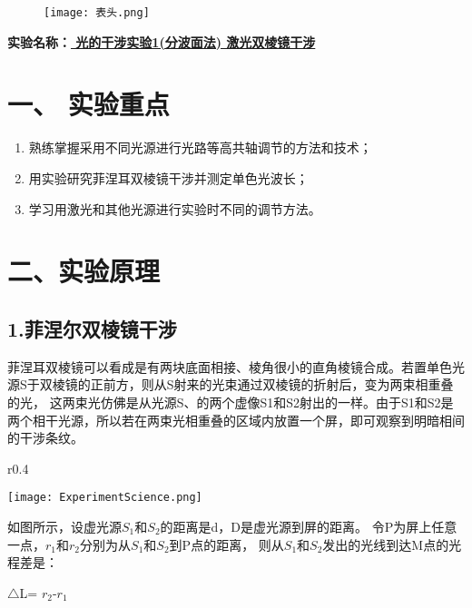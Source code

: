 \documentclass[11pt,a4paper,oneside]{article}
\begin{document}
\begin{figure}[H]
 \centering
  \texttt{[image: 表头.png]}
\end{figure}
\begin{center}
\textbf{{\large 实验名称：\uline{          光的干涉实验1(分波面法) 激光双棱镜干涉       }}}
\end{center}

\section*{一、 实验重点}
\begin{enumerate}
 \item 熟练掌握采用不同光源进行光路等高共轴调节的方法和技术；
 \item 用实验研究菲涅耳双棱镜干涉并测定单色光波长；
 \item 学习用激光和其他光源进行实验时不同的调节方法。
\end{enumerate}

\section*{二、实验原理}

\subsection*{1.菲涅尔双棱镜干涉}
菲涅耳双棱镜可以看成是有两块底面相接、棱角很小的直角棱镜合成。若置单色光源S于双棱镜的正前方，则从S射来的光束通过双棱镜的折射后，变为两束相重叠的光，
这两束光仿佛是从光源S、的两个虚像S1和S2射出的一样。由于S1和S2是两个相干光源，所以若在两束光相重叠的区域内放置一个屏，即可观察到明暗相间的干涉条纹。

\begin{wrapfigure}{r}{0.4\textwidth}
  \vspace{-20pt}
  \begin{center}
    \texttt{[image: ExperimentScience.png]}
  \end{center}
  \vspace{-20pt}
  \vspace{-10pt}
\end{wrapfigure}

如图所示，设虚光源$S_1$和$S_2$的距离是d，D是虚光源到屏的距离。
令P为屏上任意一点，$r_1$和$r_2$分别为从$S_1$和$S_2$到P点的距离，
则从$S_1$和$S_2$发出的光线到达M点的光程差是：

\begin{center}
$\bigtriangleup$L= $r_2$-$r_1$
\end{center}
\end{document}
